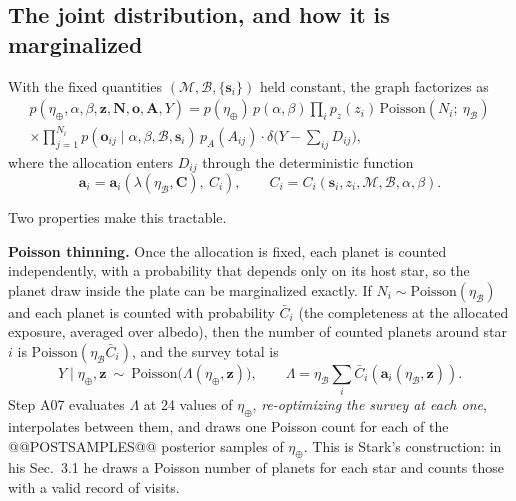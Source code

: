 \documentclass[11pt,a4paper]{article}
\begin{document}
\subsection{The joint distribution, and how it is marginalized}
\label{sec:joint}

With the fixed quantities $(\mathcal{M}, \mathcal{B}, \{\mathbf{s}_i\})$ held constant, the graph
factorizes as
\begin{multline}
p(\eta_\oplus, \alpha, \beta, \mathbf{z}, \mathbf{N}, \mathbf{o}, \mathbf{A}, Y)
= p(\eta_\oplus)\,p(\alpha,\beta)\prod_{i} p_z(z_i)\,
\mathrm{Poisson}\!\left(N_i;\ \eta_\mathcal{B}\right) \\
\times \prod_{j=1}^{N_i} p(\mathbf{o}_{ij} \mid \alpha, \beta, \mathcal{B}, \mathbf{s}_i)\,p_A(A_{ij})
\cdot \delta\!\Big(Y - \sum_{ij} D_{ij}\Big),
\label{eq:joint}
\end{multline}
where the allocation enters $D_{ij}$ through the deterministic function
\begin{equation}
\mathbf{a}_i = \mathbf{a}_i\!\left(\lambda(\eta_\mathcal{B}, \mathbf{C}),\ C_i\right),
\qquad C_i = C_i(\mathbf{s}_i, z_i, \mathcal{M}, \mathcal{B}, \alpha, \beta).
\label{eq:alloc}
\end{equation}

Two properties make this tractable.

\textbf{Poisson thinning.} Once the allocation is fixed, each planet is counted independently,
with a probability that depends only on its host star, so the planet draw inside the plate can be
marginalized exactly. If $N_i \sim \mathrm{Poisson}(\eta_\mathcal{B})$ and each planet is counted
with probability $\bar{C}_i$ (the completeness at the allocated exposure, averaged over albedo),
then the number of counted planets around star $i$ is
$\mathrm{Poisson}(\eta_\mathcal{B}\bar{C}_i)$, and the survey total is
\begin{equation}
Y \mid \eta_\oplus, \mathbf{z} \ \sim\ \mathrm{Poisson}\!\Big(\Lambda(\eta_\oplus, \mathbf{z})\Big),
\qquad
\Lambda = \eta_\mathcal{B} \sum_i \bar{C}_i\!\left(\mathbf{a}_i(\eta_\mathcal{B}, \mathbf{z})\right).
\label{eq:thinning}
\end{equation}
Step A07 evaluates $\Lambda$ at 24 values of $\eta_\oplus$, \emph{re-optimizing the survey at
each one}, interpolates between them, and draws one Poisson count for each of the @@POSTSAMPLES@@
posterior samples of $\eta_\oplus$. This is Stark's construction: in his Sec.~3.1 he draws a
Poisson number of planets for each star and counts those with a valid record of visits.
\end{document}
